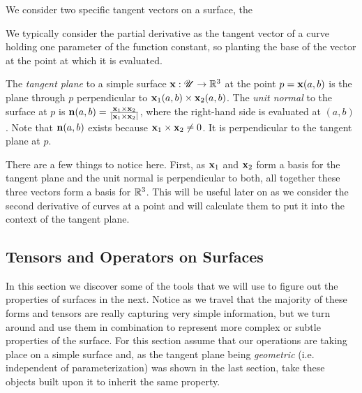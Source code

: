 \begin{defn} %
  We consider two specific tangent vectors on a surface, the 
\end{defn}

\begin{unno_rem}
  We typically consider the partial derivative as the tangent vector of a curve holding one parameter of the function constant, so planting the base of the vector at the point at which it is evaluated.
\end{unno_rem}



\begin{defn}
  The \emph{tangent plane} to a simple surface  $\mathbf{x}: \mathscr{U} \to \mathbb{R}^3$ at the point $p = \mathbf{x}(a, b)$ is the plane through $p$ perpendicular to $\mathbf{x}_1(a, b) \times \mathbf{x}_2(a, b)$. The \emph{unit normal} to the surface at $p$ is $\mathbf{n}(a, b) = \frac{\mathbf{x}_1 \times \mathbf{x}_2}{\left|\mathbf{x}_1 \times \mathbf{x}_2\right|}$, where the right-hand side is evaluated at $(a, b)$. Note that $\mathbf{n}(a, b)$ exists because $\mathbf{x}_1 \times \mathbf{x}_2 \neq 0$. It is perpendicular to the tangent plane at $p$.
\end{defn}

\begin{unno_rem}
  There are a few things to notice here. First, as $\mathbf{x}_1$ and $\mathbf{x}_2$ form a basis for the tangent plane and the unit normal is perpendicular to both, all together these three vectors form a basis for $\mathbb{R}^3$. This will be useful later on as we consider the second derivative of curves at a point and will calculate them to put it into the context of the tangent plane.
\end{unno_rem}


\subsection{Tensors and Operators on Surfaces}

In this section we discover some of the tools that we will use to figure out the properties of surfaces in the next. Notice as we travel that the majority of these forms and tensors are really capturing very simple information, but we turn around and use them in combination to represent more complex or subtle properties of the surface. For this section assume that our operations are taking place on a simple surface and, as the tangent plane being \emph{geometric} (i.e. independent of parameterization) was shown in the last section, take these objects built upon it to inherit the same property.

